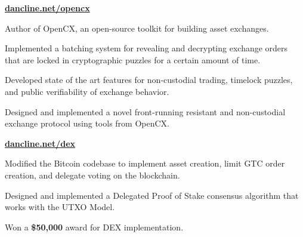 
\hfill \href{https://dancline.net/opencx}{\textbf{dancline.net/opencx}}
\begin{tightemize}
  \item Author of OpenCX, an open-source toolkit for building asset exchanges.
  \item Implemented a batching system for revealing and decrypting exchange orders that are locked in cryptographic puzzles for a certain amount of time.
  \item Developed state of the art features for non-custodial trading,
      timelock puzzles, and public verifiability of exchange behavior.
  \item Designed and implemented a novel front-running resistant and non-custodial exchange protocol using tools from OpenCX.
\end{tightemize}
\subsectionsep


\hfill \href{https://dancline.net/dex}{\textbf{dancline.net/dex}}
\begin{tightemize}
  \item Modified the Bitcoin codebase to implement asset creation, limit GTC
    order creation, and delegate voting on the blockchain.
  \item Designed and implemented a Delegated Proof of
      Stake consensus algorithm that works with the UTXO Model.
  \item Won a \textbf{\$50,000} award for DEX implementation.
\end{tightemize}
